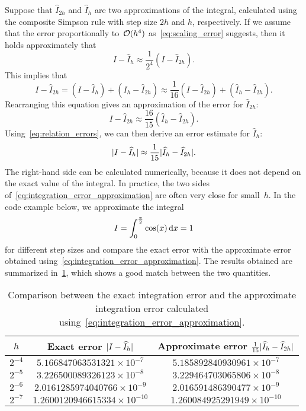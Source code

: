 Suppose that $\widehat I_{2h}$ and $\widehat I_{h}$ are two approximations of the integral,
calculated using the composite Simpson rule with step size $2h$ and $h$, respectively.
If we assume that the error proportionally to~$\mathcal O(h^4)$ as~\eqref{eq:scaling_error} suggests,
then it holds approximately that
\begin{equation}
    \label{eq:relation_errors}
    I - \widehat I_{h} \approx \frac{1}{2^4} (I - \widehat I_{2h}).
\end{equation}
This implies that
\[
    I - \widehat I_{2h} = (I - \widehat I_h) + (I_h - \widehat I_{2h}) \approx \frac{1}{16}(I - \widehat I_{2h}) + (\widehat I_h - \widehat I_{2h}).
\]
Rearranging this equation gives an approximation of the error for $\widehat I_{2h}$:
\[
    I - \widehat I_{2h} \approx \frac{16}{15} (\widehat I_h - \widehat I_{2h}).
\]
Using~\eqref{eq:relation_errors},
we can then derive an error estimate for $\widehat I_h$:
\begin{equation}
    \label{eq:integration_error_approximation}
    \lvert I - \widehat I_{h}\rvert \approx \frac{1}{15} \lvert\widehat I_h - \widehat I_{2h}\rvert.
\end{equation}
The right-hand side can be calculated numerically,
because it does not depend on the exact value of the integral.
In practice,
the two sides of~\eqref{eq:integration_error_approximation} are often very close for small~$h$.
In the code example below,
we approximate the integral
\begin{equation}
    \label{eq:integral_example}
    I = \int_{0}^{\frac{\pi}{2}} \cos(x) \, \mathrm d x = 1
\end{equation}
for different step sizes
and compare the exact error with the approximate error obtained using~\eqref{eq:integration_error_approximation}.
The results obtained are summarized in~\cref{tab:discretization_error},
which shows a good match between the two quantities.
\begin{table}[ht!]
    \def\arraystretch{1.5}
    \centering
    \caption{Comparison between the exact integration error and the approximate integration error calculated using~\eqref{eq:integration_error_approximation}.}
    \label{tab:discretization_error}
    \begin{tabular}{|c|c|c|}
        \hline
        $h$ & Exact error $\lvert I - \widehat I_h\rvert$ & Approximate error $\frac{1}{15}\lvert\widehat I_h - \widehat I_{2h}\rvert$
        \\ \hline
        $2^{-4}$ & $5.166847063531321 \times 10^{-7}$ & $5.185892840930961 \times 10^{-7}$
        \\ \hline
            $2^{-5}$ & $3.226500089326123 \times 10^{-8}$ & $3.229464703065806 \times 10^{-8}$
        \\ \hline
                $2^{-6}$ & $2.0161285974040766 \times 10^{-9}$ & $2.016591486390477 \times 10^{-9}$
        \\ \hline
                    $2^{-7}$ & $1.2600120946615334 \times 10^{-10}$ & $1.260084925291949 \times 10^{-10}$
        \\ \hline
    \end{tabular}
\end{table}

